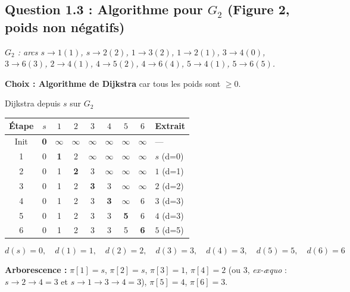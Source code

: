 \documentclass[12pt,a4paper]{article}
\begin{document}
\subsection{Question 1.3 : Algorithme pour $G_2$ (Figure 2, poids non négatifs)}

\textit{$G_2$ : arcs $s\!\to\!1(1)$, $s\!\to\!2(2)$, $1\!\to\!3(2)$, $1\!\to\!2(1)$, $3\!\to\!4(0)$, $3\!\to\!6(3)$, $2\!\to\!4(1)$, $4\!\to\!5(2)$, $4\!\to\!6(4)$, $5\!\to\!4(1)$, $5\!\to\!6(5)$.}

\begin{solution}
\textbf{Choix : Algorithme de Dijkstra} car tous les poids sont $\ge 0$.
\end{solution}

\begin{etape}{Dijkstra depuis $s$ sur $G_2$}
\begin{center}
\renewcommand{\arraystretch}{1.2}
\begin{tabular}{|c|c|c|c|c|c|c|c|l|}
\hline
\textbf{Étape} & $s$ & $1$ & $2$ & $3$ & $4$ & $5$ & $6$ & \textbf{Extrait} \\\hline
Init & \textbf{0} & $\infty$ & $\infty$ & $\infty$ & $\infty$ & $\infty$ & $\infty$ & --- \\\hline
1 & 0 & \textbf{1} & 2 & $\infty$ & $\infty$ & $\infty$ & $\infty$ & $s$ (d=0) \\\hline
2 & 0 & 1 & \textbf{2} & 3 & $\infty$ & $\infty$ & $\infty$ & $1$ (d=1) \\\hline
3 & 0 & 1 & 2 & \textbf{3} & 3 & $\infty$ & $\infty$ & $2$ (d=2) \\\hline
4 & 0 & 1 & 2 & 3 & \textbf{3} & $\infty$ & 6 & $3$ (d=3) \\\hline
5 & 0 & 1 & 2 & 3 & 3 & \textbf{5} & 6 & $4$ (d=3) \\\hline
6 & 0 & 1 & 2 & 3 & 3 & 5 & \textbf{6} & $5$ (d=5) \\\hline
\end{tabular}
\end{center}
\end{etape}

\begin{resultat}
\[
d(s)=0,\quad d(1)=1,\quad d(2)=2,\quad d(3)=3,\quad d(4)=3,\quad d(5)=5,\quad d(6)=6
\]

\textbf{Arborescence :} $\pi[1]=s$, $\pi[2]=s$, $\pi[3]=1$, $\pi[4]=2$ (ou $3$, \emph{ex-æquo} : $s\!\to\!2\!\to\!4=3$ et $s\!\to\!1\!\to\!3\!\to\!4=3$), $\pi[5]=4$, $\pi[6]=3$.
\end{resultat}
\end{document}
